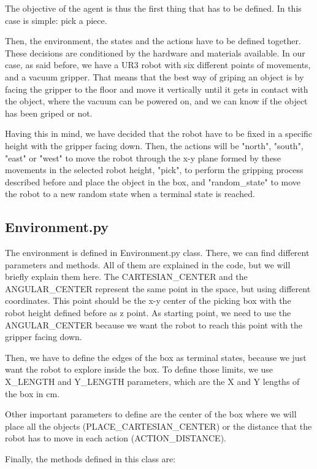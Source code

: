 			The objective of the agent is thus the first thing that has to be defined. In this case is simple: pick a piece.
			
			Then, the environment, the states and the actions have to be defined together. These decisions are conditioned by the hardware and materials available. In our case, as said before, we have a UR3 robot with six different points of movements, and a vacuum gripper. That means that the best way of griping an object is by facing the gripper to the floor and move it vertically until it gets in contact with the object, where the vacuum can be powered on, and we can know if the object has been griped or not.
			
			Having this in mind, we have decided that the robot have to be fixed in a specific height with the gripper facing down. Then, the actions will be "north", "south", "east" or "west" to move the robot through the x-y plane formed by these movements in the selected robot height, "pick", to perform the gripping process described before and place the object in the box, and "random\_state" to move the robot to a new random state when a terminal state is reached.
			
		\subsection{Environment.py}
			The environment is defined in Environment.py class. There, we can find different parameters and methods. All of them are explained in the code, but we will briefly explain them here. The CARTESIAN\_CENTER and the ANGULAR\_CENTER represent the same point in the space, but using different coordinates. This point should be the x-y center of the picking box with the robot height defined before as z point. As starting point, we need to use the ANGULAR\_CENTER because we want the robot to reach this point with the gripper facing down.
			
			Then, we have to define the edges of the box as terminal states, because we just want the robot to explore inside the box. To define those limits, we use X\_LENGTH and Y\_LENGTH parameters, which are the X and Y lengths of the box in cm.
			
			Other important parameters to define are the center of the box where we will place all the objects (PLACE\_CARTESIAN\_CENTER) or the distance that the robot has to move in each action (ACTION\_DISTANCE).
			
			Finally, the methods defined in this class are:
			
